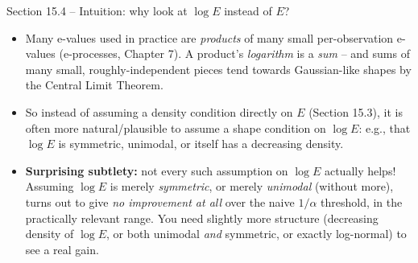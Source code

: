 \documentclass[aspectratio=169,10pt]{beamer}
\begin{document}
\begin{frame}{Section 15.4 -- Intuition: why look at $\log E$ instead of $E$?}
  \begin{itemize}
    \item Many e-values used in practice are \emph{products} of many small per-observation e-values (e-processes, Chapter 7). A product's \emph{logarithm} is a \emph{sum} -- and sums of many small, roughly-independent pieces tend towards Gaussian-like shapes by the Central Limit Theorem.
    \item So instead of assuming a density condition directly on $E$ (Section 15.3), it is often more natural/plausible to assume a shape condition on $\log E$: e.g., that $\log E$ is symmetric, unimodal, or itself has a decreasing density.
    \item \textbf{Surprising subtlety:} not every such assumption on $\log E$ actually helps! Assuming $\log E$ is merely \emph{symmetric}, or merely \emph{unimodal} (without more), turns out to give \emph{no improvement at all} over the naive $1/\alpha$ threshold, in the practically relevant range. You need slightly more structure (decreasing density of $\log E$, or both unimodal \emph{and} symmetric, or exactly log-normal) to see a real gain.
  \end{itemize}
\end{frame}
\end{document}
